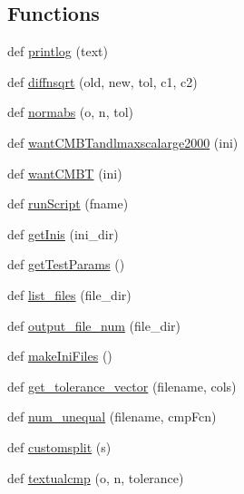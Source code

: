 \subsection*{Functions}
\begin{DoxyCompactItemize}
\item 
def \mbox{\hyperlink{namespaceCAMB__test__files_a55a6c3bc344b92ad1a96f55cfc36f619}{printlog}} (text)
\item 
def \mbox{\hyperlink{namespaceCAMB__test__files_a64d237c051d366401dcdc40415829dca}{diffnsqrt}} (old, new, tol, c1, c2)
\item 
def \mbox{\hyperlink{namespaceCAMB__test__files_a942fd27486efa4cad8f9592101d8d6b4}{normabs}} (o, n, tol)
\item 
def \mbox{\hyperlink{namespaceCAMB__test__files_af180889cae33202fe38467a5104dc783}{want\+C\+M\+B\+Tandlmaxscalarge2000}} (ini)
\item 
def \mbox{\hyperlink{namespaceCAMB__test__files_ab28edef047b56aa699abc0b3212cd5fa}{want\+C\+M\+BT}} (ini)
\item 
def \mbox{\hyperlink{namespaceCAMB__test__files_a1aa48bd86ed68f1c0b441e871086dbfa}{run\+Script}} (fname)
\item 
def \mbox{\hyperlink{namespaceCAMB__test__files_aeb8138884c3f3796f817f15a04d3bbb2}{get\+Inis}} (ini\+\_\+dir)
\item 
def \mbox{\hyperlink{namespaceCAMB__test__files_a58c704352d09b51b6422bbd028119e8f}{get\+Test\+Params}} ()
\item 
def \mbox{\hyperlink{namespaceCAMB__test__files_ad8e40066d0c7e67c40c354153d790106}{list\+\_\+files}} (file\+\_\+dir)
\item 
def \mbox{\hyperlink{namespaceCAMB__test__files_a2aa5d4f5677cf5a78388238c4dc45b7d}{output\+\_\+file\+\_\+num}} (file\+\_\+dir)
\item 
def \mbox{\hyperlink{namespaceCAMB__test__files_a2071b2434992a52dd7fc9c49db14d86d}{make\+Ini\+Files}} ()
\item 
def \mbox{\hyperlink{namespaceCAMB__test__files_a0191b8bd66eb62d12d53cb0c2267074e}{get\+\_\+tolerance\+\_\+vector}} (filename, cols)
\item 
def \mbox{\hyperlink{namespaceCAMB__test__files_a79f9b0e8484d9f397e2dc4addc178620}{num\+\_\+unequal}} (filename, cmp\+Fcn)
\item 
def \mbox{\hyperlink{namespaceCAMB__test__files_a279603bcda2879c085f8dc09c58baa73}{customsplit}} (s)
\item 
def \mbox{\hyperlink{namespaceCAMB__test__files_ab9daec082b15ebd0f1fdbef965cb2c82}{textualcmp}} (o, n, tolerance)
\end{DoxyCompactItemize}
